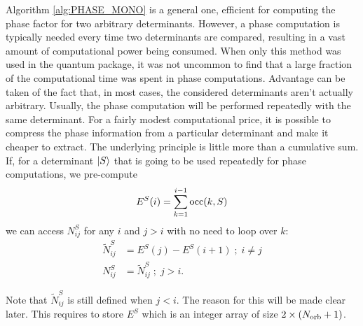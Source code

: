 \documentclass[./thesis.tex]{subfiles}
\begin{document}
Algorithm \ref{alg:PHASE_MONO} is a general one, efficient for computing the phase factor for two arbitrary determinants. However, a phase computation is typically needed every time two determinants are compared, resulting in a vast amount of computational power being consumed. When only this method was used in the quantum package, it was not uncommon to find that a large fraction of the computational time was spent in phase computations.
Advantage can be taken of the fact that, in most cases, the considered determinants aren't actually arbitrary. Usually, the phase computation will be performed repeatedly with the same determinant. For a fairly modest computational price, it is possible to compress the phase information from a particular determinant and make it cheaper to extract. The underlying principle is little more than a cumulative sum. If, for a determinant $\ket{S}$ that is going to be used repeatedly for phase computations, we pre-compute
\begin{equation}
E^S(i) = \sum_{k=1}^{i-1} {\text{occ}(k,S)}
\end{equation}
we can access $N^S_{ij}$ for any $i$ and $j>i$ with no need to loop over $k$:
\begin{align}
\tilde N^S_{ij} &= E^S(j) - E^S(i+1) \; ; \; i \neq j \\
N^S_{ij} &= \tilde N^S_{ij} \; ; \; j>i.
\end{align}

Note that $\tilde N^S_{ij}$ is still defined when $j<i$. The reason for this will be made clear later.
This requires to store $E^S$ which is an integer array of size $2 \times ({N_\text{orb}}+1)$. 




\end{document}
